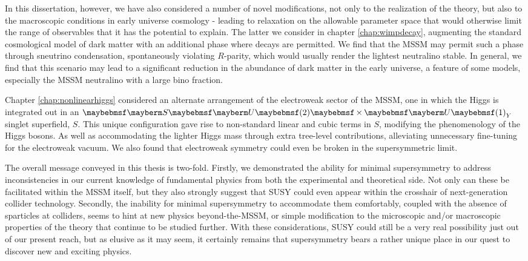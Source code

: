 In this dissertation, however, we have also considered a number of novel modifications, not only to the realization of the theory, but also to the macroscopic conditions in early universe cosmology - leading to relaxation on the allowable parameter space that would otherwise limit the range of observables that it has the potential to explain. The latter we consider in chapter \ref{chap:wimpdecay}, augmenting the standard cosmological model of dark matter with an additional phase where decays are permitted. We find that the MSSM may permit such a phase through sneutrino condensation, spontaneously violating $R$-parity, which would usually render the lightest neutralino stable. In general, we find that this scenario may lead to a significant reduction in the abundance of dark matter in the early universe, a feature of some models, especially the MSSM neutralino with a large bino fraction.

Chapter \ref{chap:nonlinearhiggs} considered an alternate arrangement of the electroweak sector of the MSSM, one in which the Higgs is integrated out in an $\SUgroup{2} \times \Ugroup{1}_Y$ singlet superfield, $S$. This unique configuration gave rise to non-standard linear and cubic terms in $S$, modifying the phenomenology of the Higgs bosons. As well as accommodating the lighter Higgs mass through extra tree-level contributions, alleviating unnecessary fine-tuning for the electroweak vacuum. We also found that electroweak symmetry could even be broken in the supersymmetric limit.

The overall message conveyed in this thesis is two-fold. Firstly, we demonstrated the ability for minimal supersymmetry to address inconsistencies in our current knowledge of fundamental physics from both the experimental and theoretical side. Not only can these be facilitated within the MSSM itself, but they also strongly suggest that SUSY could even appear within the crosshair of next-generation collider technology. Secondly, the inability for minimal supersymmetry to accommodate them comfortably, coupled with the absence of sparticles at colliders, seems to hint at new physics beyond-the-MSSM, or simple modification to the microscopic and/or macroscopic properties of the theory that continue to be studied further. With these considerations, SUSY could still be a very real possibility just out of our present reach, but as elusive as it may seem, it certainly remains that supersymmetry bears a rather unique place in our quest to discover new and exciting physics.

